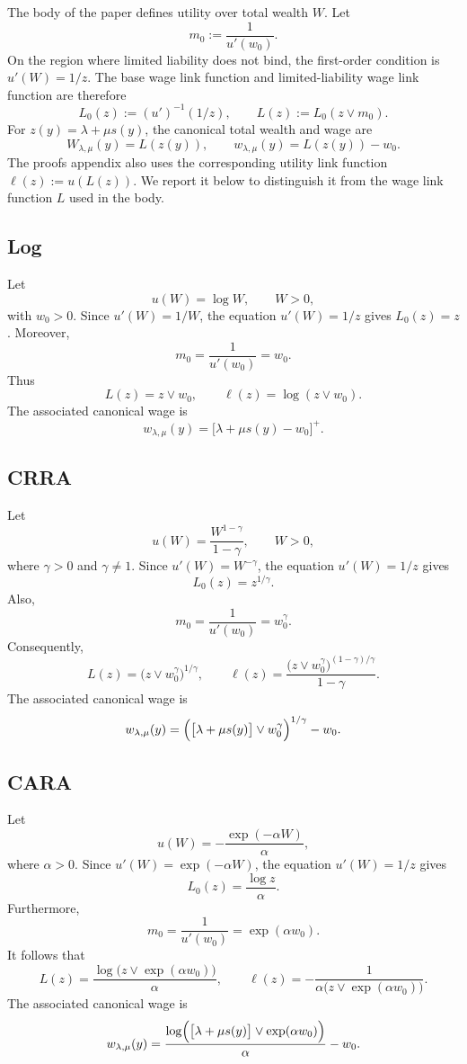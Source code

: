 \documentclass[12pt]{article}
\begin{document}
The body of the paper defines utility over total wealth $W$.  Let
\[
    m_0:=\frac{1}{u'(w_0)}.
\]
On the region where limited liability does not bind, the first-order condition
is $u'(W)=1/z$.  The base wage link function and limited-liability wage link function are
therefore
\[
    L_0(z):=(u')^{-1}(1/z),
    \qquad
    L(z):=L_0(z\vee m_0).
\]
For $z(y)=\lambda+\mu s(y)$, the canonical total wealth and wage are
\[
    W_{\lambda,\mu}(y)=L(z(y)),
    \qquad
    w_{\lambda,\mu}(y)=L(z(y))-w_0.
\]
The proofs appendix also uses the corresponding utility link function
$\ell(z):=u(L(z))$.  We report it below to distinguish it from the wage link
function $L$ used in the body.

\subsection{Log}

Let
\[
    u(W)=\log W,
    \qquad W>0,
\]
with $w_0>0$.  Since $u'(W)=1/W$, the equation $u'(W)=1/z$ gives
$L_0(z)=z$.  Moreover,
\[
    m_0=\frac{1}{u'(w_0)}=w_0.
\]
Thus
\[
    L(z)=z\vee w_0,
    \qquad
    \ell(z)=\log(z\vee w_0).
\]
The associated canonical wage is
\[
    w_{\lambda,\mu}(y)
    =\bigl[\lambda+\mu s(y)-w_0\bigr]^+.
\]

\subsection{CRRA}

Let
\[
    u(W)=\frac{W^{1-\gamma}}{1-\gamma},
    \qquad W>0,
\]
where $\gamma>0$ and $\gamma\neq1$.  Since $u'(W)=W^{-\gamma}$, the equation
$u'(W)=1/z$ gives
\[
    L_0(z)=z^{1/\gamma}.
\]
Also,
\[
    m_0=\frac{1}{u'(w_0)}=w_0^\gamma.
\]
Consequently,
\[
    L(z)=\bigl(z\vee w_0^\gamma\bigr)^{1/\gamma},
    \qquad
    \ell(z)
    =\frac{\bigl(z\vee w_0^\gamma\bigr)^{(1-\gamma)/\gamma}}
           {1-\gamma}.
\]
The associated canonical wage is
\[
    w_{\lambda,\mu}(y)
    =\Bigl(\bigl[\lambda+\mu s(y)\bigr]\vee w_0^\gamma\Bigr)^{1/\gamma}-w_0.
\]

\subsection{CARA}

Let
\[
    u(W)=-\frac{\exp(-\alpha W)}{\alpha},
\]
where $\alpha>0$.  Since $u'(W)=\exp(-\alpha W)$, the equation
$u'(W)=1/z$ gives
\[
    L_0(z)=\frac{\log z}{\alpha}.
\]
Furthermore,
\[
    m_0=\frac{1}{u'(w_0)}=\exp(\alpha w_0).
\]
It follows that
\[
    L(z)=\frac{\log\bigl(z\vee\exp(\alpha w_0)\bigr)}{\alpha},
    \qquad
    \ell(z)=-\frac{1}{\alpha\bigl(z\vee\exp(\alpha w_0)\bigr)}.
\]
The associated canonical wage is
\[
    w_{\lambda,\mu}(y)
    =\frac{\log\Bigl(\bigl[\lambda+\mu s(y)\bigr]
                       \vee\exp(\alpha w_0)\Bigr)}{\alpha}
     -w_0.
\]
\end{document}
